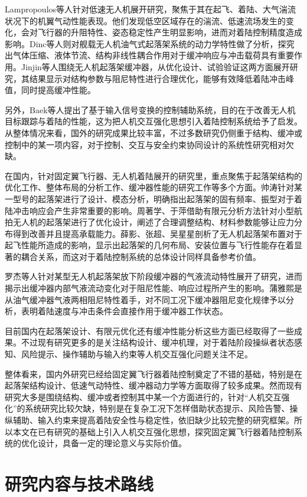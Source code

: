 Lampropoulos等人针对低速无人机展开研究，聚焦于其在起飞、着陆、大气湍流状况下的机翼气动性能表现。他们发现低空区域存在的湍流、低速流场发生的变化，会对飞行器的升阻特性、姿态稳定性产生明显影响，进而对着陆控制精度造成影响。Dinc等人则对舰载无人机油气式起落架系统的动力学特性做了分析，探究出气体压缩、液体节流、结构非线性耦合作用对于缓冲响应与冲击载荷具有重要作用。Jinjin等人围绕无人机起落架缓冲器，从优化设计、试验验证这两方面展开研究，其结果显示对结构参数与阻尼特性进行合理优化，能够有效降低着陆冲击峰值，同时提高缓冲性能。

另外，Baek等人提出了基于输入信号变换的控制辅助系统，目的在于改善无人机目标跟踪与着陆的性能，这为把人机交互强化思想引入着陆控制系统给予了启发。从整体情况来看，国外的研究成果比较丰富，不过多数研究仍侧重于结构、缓冲或控制中的某一项内容，对于控制、交互与安全约束协同设计的系统性研究相对欠缺。

在国内，针对固定翼飞行器、无人机着陆展开的研究里，重点聚焦于起落架结构的优化工作、整体布局的分析工作、缓冲器性能的研究工作等多个方面。帅涛针对某一型号的起落架进行了设计、模态分析，明确指出起落架的固有频率、振型对于着陆冲击响应会产生非常重要的影响。周著学、于萍借助有限元分析方法针对小型航拍无人机的起落架进行了优化设计，阐述了合理调整结构、材料参数能够让应力分布得到改善并且提高承载能力。薛影、张超、吴星星剖析了无人机起落架布置对于起飞性能所造成的影响，显示出起落架的几何布局、安装位置与飞行性能存在着显著的耦合关系，而这对于着陆控制系统的总体设计同样具备参考价值。

罗杰等人针对某型无人机起落架放下阶段缓冲器的气液流动特性展开了研究，进而揭示出缓冲器内部气液流动变化对于阻尼性能、响应过程所产生的影响。蒲雅熙是从油气缓冲器气液两相阻尼特性着手，对不同工况下缓冲器阻尼变化规律予以分析，表明着陆速度与冲击条件会直接作用于缓冲器工作状态。

目前国内在起落架设计、有限元优化还有缓冲性能分析这些方面已经取得了一些成果。不过现有研究更多的是关注结构设计、缓冲机理，对于着陆阶段操纵者状态感知、风险提示、操作辅助与输入约束等人机交互强化问题关注不足。

整体看来，国内外研究已经给固定翼飞行器着陆控制奠定了不错的基础，特别是在起落架结构设计、低速气动特性、缓冲器动力学等方面取得了较多成果。然而现有研究大多是围绕结构、缓冲或者控制其中某一个方面进行的，针对``人机交互强化''的系统研究比较欠缺，特别是在复杂工况下怎样借助状态提示、风险告警、操纵辅助、输入约束来提高着陆安全性与稳定性，依旧缺少比较完整的研究框架。所以本文在已有研究的基础上引入人机交互强化思想，探究固定翼飞行器着陆控制系统的优化设计，具备一定的理论意义与实际价值。

\section{研究内容与技术路线}
